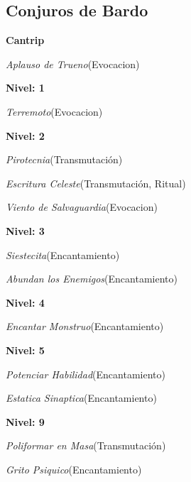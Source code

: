 \documentclass[a4paper,twocolumn,openany,10pt]{dndbook}
\begin{document}
\subsection*{Conjuros de Bardo}
\begin{list}{}{}
	\item \textbf{Cantrip}
	\begin{list}{}{}
		\item \textit{Aplauso de Trueno}(Evocacion)
	\end{list}

	\item \textbf{Nivel: 1}
	\begin{list}{}{}
		\item \textit{Terremoto}(Evocacion)
	\end{list}

	\item \textbf{Nivel: 2}
	\begin{list}{}{}
		\item \textit{Pirotecnia}(Transmutación)
		\item \textit{Escritura Celeste}(Transmutación, Ritual)
		\item \textit{Viento de Salvaguardia}(Evocacion)
	\end{list}

	\item \textbf{Nivel: 3}
	\begin{list}{}{}
		\item \textit{Siestecita}(Encantamiento)
		\item \textit{Abundan los Enemigos}(Encantamiento)
	\end{list}

	\item \textbf{Nivel: 4}
	\begin{list}{}{}
		\item \textit{Encantar Monstruo}(Encantamiento)
	\end{list}

	\item \textbf{Nivel: 5}
	\begin{list}{}{}
		\item \textit{Potenciar Habilidad}(Encantamiento)
		\item \textit{Estatica Sinaptica}(Encantamiento)
	\end{list}

	\item \textbf{Nivel: 9}
	\begin{list}{}{}
		\item \textit{Poliformar en Masa}(Transmutación)
		\item \textit{Grito Psiquico}(Encantamiento)
	\end{list}
\end{list}
\end{document}
